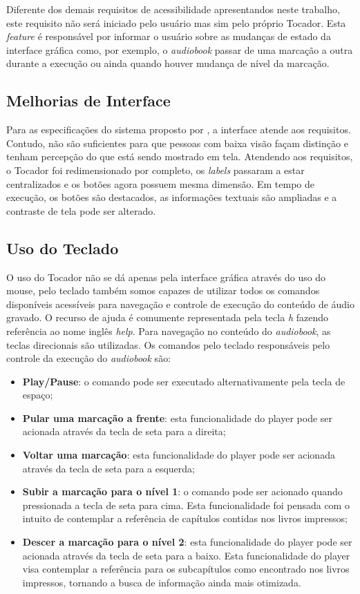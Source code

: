 Diferente dos demais requisitos de acessibilidade apresentandos neste trabalho, este requisito não será iniciado pelo usuário mas sim pelo próprio Tocador. Esta \textit{feature} é responsável por informar o usuário sobre as mudanças de estado da interface gráfica como, por exemplo, o \textit{audiobook} passar de uma marcação a outra durante a execução ou ainda quando houver mudança de nível da marcação.

\subsection{Melhorias de Interface}

Para as especificações do sistema proposto por \cite{herbert}, a interface atende aos requisitos. Contudo, não são suficientes para que pessoas com baixa visão façam distinção e tenham percepção do que está sendo mostrado em tela. Atendendo aos requisitos, o Tocador foi redimensionado por completo, os \textit{labels} passaram a estar centralizados e os botões agora possuem mesma dimensão. Em tempo de execução, os botões são destacados, as informações textuais são ampliadas e a contraste de tela pode ser alterado.

\subsection{Uso do Teclado}

O uso do Tocador não se dá apenas pela interface gráfica através do uso do mouse, pelo teclado também somos capazes de utilizar todos os comandos disponíveis acessíveis para navegação e controle de execução do conteúdo de áudio gravado. O recurso de ajuda é comumente representada pela tecla \textit{h} fazendo referência ao nome inglês \textit{help}. Para navegação no conteúdo do \textit{audiobook}, as teclas direcionais são utilizadas. Os comandos pelo teclado responsáveis pelo controle da execução do \textit{audiobook} são:

\begin{itemize}
	\item{\textbf{Play/Pause}:} o comando pode ser executado alternativamente pela tecla de espaço;
	\item{\textbf{Pular uma marcação a frente}:} esta funcionalidade do player pode ser acionada através da tecla de seta para a direita;
	\item{\textbf{Voltar uma marcação}:} esta funcionalidade do player pode ser acionada através da tecla de seta para a esquerda;
	\item{\textbf{Subir a marcação para o nível 1}:} o comando pode ser acionado quando pressionada a tecla de seta para cima. Esta funcionalidade foi pensada com o intuito de contemplar a referência de capítulos contidas nos livros impressos;
	\item{\textbf{Descer a marcação para o nível 2}:} esta funcionalidade do player pode ser acionada através da tecla de seta para a baixo. Esta funcionalidade do player visa contemplar a referência para os subcapítulos como encontrado nos livros impressos, tornando a busca de informação ainda mais otimizada.
\end{itemize}

